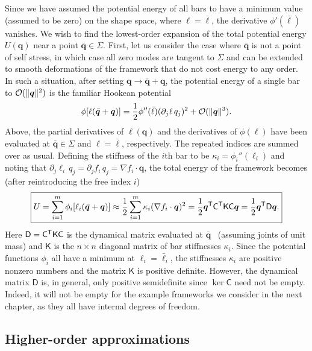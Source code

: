 Since we have assumed the potential energy of all bars to have a minimum value (assumed to be zero) on the shape space, where $\ell = \bar{\ell}$, the derivative $\phi'(\bar{\ell})$ vanishes.
We wish to find the lowest-order expansion of the total potential energy $U(\bm{q})$ near a point $\bar{\bm{q}} \in \Sigma$.
First, let us consider the case where $\bar{\bm{q}}$ is not a point of self stress, in which case all zero modes are tangent to $\Sigma$ and can be extended to smooth deformations of the framework that do not cost energy to any order.
In such a situation, after setting $\bm{q} \to \bar{\bm{q}} + \bm{q}$, the potential energy of a single bar to $\mathcal{O}(\lVert\bm{q}\rVert^2)$ is the familiar Hookean potential
%
\begin{equation}
  \phi[\ell(\bar{\bm{q}} + \bm{q})] =  \frac{1}{2}\phi''(\bar{\ell})(\partial_j \ell\,q_j)^2 + \mathcal{O}(\lVert\bm{q}\rVert^3).
\end{equation}
%
Above, the partial derivatives of $\ell(\bm{q})$ and the derivatives of $\phi(\ell)$ have been evaluated at $\bar{\bm{q}} \in \Sigma$ and $\ell = \bar{\ell}$, respectively.
The repeated indices are summed over as usual.
Defining the stiffness of the $i$th bar to be $\kappa_{i} = \phi_{i}''(\ell_{i})$ and noting that $\partial_{j}\ell_{i}\,q_{j} = \partial_{j}f_{i}\,q_{j} = \nabla f_{i}\cdot\bm{q}$, the total energy of the framework becomes (after reintroducing the free index $i$)
%
\begin{equation}\boxed{%
  U = \sum_{i=1}^m \phi_i[\ell_i(\bar{\bm{q}} + \bm{q})] \approx \frac{1}{2} \sum_{i=1}^m \kappa_i (\nabla f_i\cdot\bm{q})^2 = \frac{1}{2}\bm{q}\trans\mathsf{C}\trans\mathsf{K}\mathsf{C}\bm{q} = \frac{1}{2}\bm{q}\trans\mathsf{D}\bm{q}.}
  \label{eq:regenergy}
\end{equation}
%
Here $\mathsf{D} = \mathsf{C}^\mathsf{T}\mathsf{K}\mathsf{C}$ is the dynamical matrix evaluated at $\bar{\bm{q}}$~\cite{lubensky2015} (assuming joints of unit mass) and $\mathsf{K}$ is the $n\times n$ diagonal matrix of bar stiffnesses $\kappa_{i}$.
Since the potential functions $\phi_{i}$ all have a minimum at $\ell_{i} = \bar{\ell}_{i}$, the stiffnesses $\kappa_{i}$ are positive nonzero numbers and the matrix $\mathsf{K}$ is positive definite.
However, the dynamical matrix $\mathsf{D}$ is, in general, only positive semidefinite since $\ker \mathsf{C}$ need not be empty.
Indeed, it will not be empty for the example frameworks we consider in the next chapter, as they all have internal degrees of freedom.

\subsection{Higher-order approximations}

